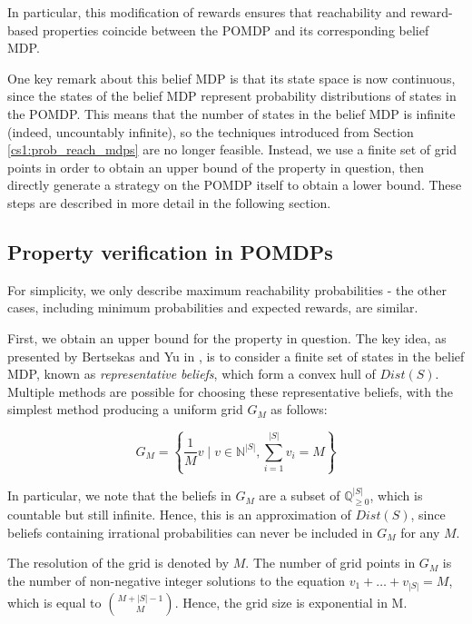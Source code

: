 In particular, this modification of rewards ensures that reachability and reward-based properties coincide between the POMDP and its corresponding belief MDP.

One key remark about this belief MDP is that its state space is now continuous, since the states of the belief MDP represent probability distributions of states in the POMDP. This means that the number of states in the belief MDP is infinite (indeed, uncountably infinite), so the techniques introduced from Section \ref{cs1:prob_reach_mdps} are no longer feasible. Instead, we use a finite set of grid points in order to obtain an upper bound of the property in question, then directly generate a strategy on the POMDP itself to obtain a lower bound. These steps are described in more detail in the following section.

\subsection{Property verification in POMDPs}

For simplicity, we only describe maximum reachability probabilities - the other cases, including minimum probabilities and expected rewards, are similar.

First, we obtain an upper bound for the property in question. The key idea, as presented by Bertsekas and Yu in \cite{bertsekas_approximate_2006}, is to consider a finite set of states in the belief MDP, known as \emph{representative beliefs}, which form a convex hull of $Dist(S)$. Multiple methods are possible for choosing these representative beliefs, with the simplest method producing a uniform grid $G_M$ as follows:

\begin{equation*}
    G_M = \left\{\frac{1}{M} v \; | \; v \in \mathbb{N}^{|S|} , \sum_{i=1}^{|S|} v_i = M \right\}
\end{equation*}

In particular, we note that the beliefs in $G_M$ are a subset of $\mathbb{Q}_{\geq 0}^{|S|}$, which is countable but still infinite. Hence, this is an approximation of $Dist(S)$, since beliefs containing irrational probabilities can never be included in $G_M$ for any $M$.

The resolution of the grid is denoted by $M$. The number of grid points in $G_M$ is the number of non-negative integer solutions to the equation $v_1 + \dots + v_{|S|} = M$, which is equal to ${M + |S| - 1 \choose M}$. Hence, the grid size is exponential in M.

